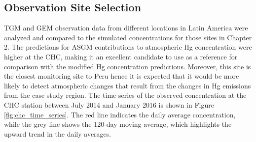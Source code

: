 
\subsection{Observation Site Selection}\label{c3_site_selection}

\begin{flushleft}
TGM and GEM observation data from different locations in Latin America were analyzed and compared to the \gc simulated \hg concentrations for those sites in Chapter 2. The \gc predictions for ASGM contributions to atmospheric Hg concentration were higher at the CHC, making it an excellent candidate to use as a reference for comparison with the modified \gc Hg concentration predictions. Moreover, this site is the closest monitoring site to Peru hence it is expected that it would be more likely to detect atmospheric \hg changes that result from the changes in Hg emissions from the case study region. The time series of the observed concentration at the CHC station between July 2014 and January 2016 is shown in Figure \ref{fig:chc_time_series}. The red line indicates the daily average concentration, while the grey line shows the 120-day moving average, which highlights the upward trend in the daily averages.
\end{flushleft}


